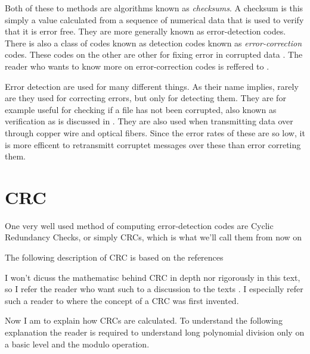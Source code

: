 Both of these to methods are algorithms known as
\textit{checksums}. A checksum is this simply a value
calculated from a sequence of numerical data that is used to verify
that it is error free. They are more generally known as
error-detection codes. There is also a class of codes known as
detection codes known as \textit{error-correction} codes. These codes
on the other are other for fixing error in corrupted data
\cite{tanenbaum2003computernetworks_crc}. The reader who wants to know
more on error-correction codes is reffered to \cite{tanenbaum2003computernetworks_crc,1950hamming_codes_crc_parity}.

Error detection are used for many different things. As their name
implies, rarely are they used for correcting errors, but only for
detecting them. They are for example useful for checking if a file has
not been corrupted, also known as verification as is discussed in
\cite{Nelson:1992:FVU:135011.135017_crc32}. They are also used when
transmitting data over through copper wire and optical fibers. Since
the error rates of these are so low, it is more efficent to
retransmitt corruptet messages over these than error correting
them\cite{tanenbaum2003computernetworks_crc}.

\section{CRC}

One very well used method of computing error-detection codes are
Cyclic Redundancy Checks, or simply CRCs, which is what we'll call them from now
on \cite{tanenbaum2003computernetworks_crc}

The following description of CRC is based on the references \cite{Ritter:1986:GCM:12647.12648,Williams_1993_crc_painless,tanenbaum2003computernetworks_crc,Nelson:1992:FVU:135011.135017_crc32,Stigge06reversingcrc}

I won't dicuss the mathematisc behind CRC in depth nor
rigorously in this text, so I refer the reader who want such to a
discussion to the texts
\cite{Stigge06reversingcrc,tanenbaum2003computernetworks_crc,Peterson_Brown_1961_crc_orig,press2007numerical_recipes,Ramabadran:1988:TCC:623224.623360_crc_tutorial}. I
especially refer such a reader to \cite{Peterson_Brown_1961_crc_orig}
where the concept of a CRC was first invented.

Now I am to explain how CRCs are calculated. To understand the
following explanation the reader is required to understand long
polynomial division only on a basic level and the modulo operation.

